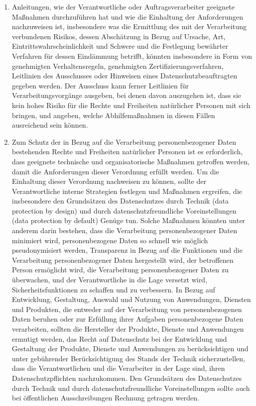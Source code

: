\begin{enumerate}

   \item Anleitungen, wie der Verantwortliche oder Auftragsverarbeiter geeignete Maßnahmen durchzuführen hat und wie die
    Einhaltung der Anforderungen nachzuweisen ist, insbesondere was die Ermittlung des mit der Verarbeitung verbundenen
    Risikos, dessen Abschätzung in Bezug auf Ursache, Art, Eintrittswahrscheinlichkeit und Schwere und die Festlegung
    bewährter Verfahren für dessen Eindämmung betrifft, könnten insbesondere in Form von genehmigten Verhaltensregeln,
    genehmigten Zertifizierungsverfahren, Leitlinien des Ausschusses oder Hinweisen eines Datenschutzbeauftragten
    gegeben werden. Der Ausschuss kann ferner Leitlinien für Verarbeitungsvorgänge ausgeben, bei denen davon auszugehen
    ist, dass sie kein hohes Risiko für die Rechte und Freiheiten natürlicher Personen mit sich bringen, und angeben,
    welche Abhilfemaßnahmen in diesen Fällen ausreichend sein können.%
   \label{eg:77}
   

   \item Zum Schutz der in Bezug auf die Verarbeitung personenbezogener Daten bestehenden Rechte und Freiheiten
    natürlicher Personen ist es erforderlich, dass geeignete technische und organisatorische Maßnahmen getroffen
    werden, damit die Anforderungen dieser Verordnung erfüllt werden. Um die Einhaltung dieser Verordnung nachweisen zu
    können, sollte der Verantwortliche interne Strategien festlegen und Maßnahmen ergreifen, die insbesondere den
    Grundsätzen des Datenschutzes durch Technik (data protection by design) und durch datenschutzfreundliche
    Voreinstellungen (data protection by default) Genüge tun. Solche Maßnahmen könnten unter anderem darin bestehen,
    dass die Verarbeitung personenbezogener Daten minimiert wird, personenbezogene Daten so schnell wie möglich
    pseudonymisiert werden, Transparenz in Bezug auf die Funktionen und die Verarbeitung personenbezogener Daten
    hergestellt wird, der betroffenen Person ermöglicht wird, die Verarbeitung personenbezogener Daten zu überwachen,
    und der Verantwortliche in die Lage versetzt wird, Sicherheitsfunktionen zu schaffen und zu verbessern. In Bezug
    auf Entwicklung, Gestaltung, Auswahl und Nutzung von Anwendungen, Diensten und Produkten, die entweder auf der
    Verarbeitung von personenbezogenen Daten beruhen oder zur Erfüllung ihrer Aufgaben personenbezogene Daten
    verarbeiten, sollten die Hersteller der Produkte, Dienste und Anwendungen ermutigt werden, das Recht auf
    Datenschutz bei der Entwicklung und Gestaltung der Produkte, Dienste und Anwendungen zu berücksichtigen und unter
    gebührender Berücksichtigung des Stands der Technik sicherzustellen, dass die Verantwortlichen und die Verarbeiter
    in der Lage sind, ihren Datenschutzpflichten nachzukommen. Den Grundsätzen des Datenschutzes durch Technik und
    durch datenschutzfreundliche Voreinstellungen sollte auch bei öffentlichen Ausschreibungen Rechnung getragen
    werden.%
   \label{eg:78}
   

\end{enumerate}
